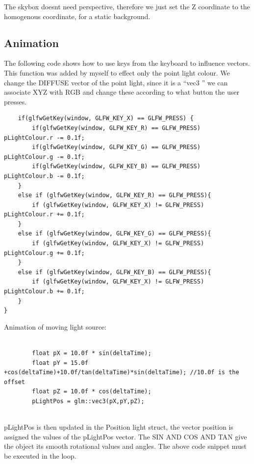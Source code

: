 \documentclass[a4paper,11pt]{article}
\begin{document}
The skybox doesnt need perspective, therefore we just set the Z coordinate to the homogenous coordinate, for a static background.

\subsection{Animation}

The following code shows how to use keys from the keyboard to influence vectors. This function was added by myself to effect only the point light colour. We change the DIFFUSE vector of the point light, since it is a ``vec3 '' we can associate XYZ with RGB and change these according to what button the user presses.
	
	\begin{lstlisting}
	if(glfwGetKey(window, GLFW_KEY_X) == GLFW_PRESS) {
        if(glfwGetKey(window, GLFW_KEY_R) == GLFW_PRESS) pLightColour.r -= 0.1f;
        if(glfwGetKey(window, GLFW_KEY_G) == GLFW_PRESS) pLightColour.g -= 0.1f;
        if(glfwGetKey(window, GLFW_KEY_B) == GLFW_PRESS) pLightColour.b -= 0.1f;
    }
    else if (glfwGetKey(window, GLFW_KEY_R) == GLFW_PRESS){
        if (glfwGetKey(window, GLFW_KEY_X) != GLFW_PRESS) pLightColour.r += 0.1f;
    }
    else if (glfwGetKey(window, GLFW_KEY_G) == GLFW_PRESS){
        if (glfwGetKey(window, GLFW_KEY_X) != GLFW_PRESS) pLightColour.g += 0.1f;
    }
    else if (glfwGetKey(window, GLFW_KEY_B) == GLFW_PRESS){
        if (glfwGetKey(window, GLFW_KEY_X) != GLFW_PRESS) pLightColour.b += 0.1f;
    }
}
	\end{lstlisting}

	
	Animation of moving light source:
	
	\begin{lstlisting}
	 
        float pX = 10.0f * sin(deltaTime);
        float pY = 15.0f +cos(deltaTime)+10.0f/tan(deltaTime)*sin(deltaTime); //10.0f is the offset
        float pZ = 10.0f * cos(deltaTime);
        pLightPos = glm::vec3(pX,pY,pZ);
        
	\end{lstlisting}
	
	pLightPos is then updated in the Position light struct, the vector position is assigned the values of the pLightPos vector. The SIN AND COS AND TAN give the object its smooth rotational values and angles. The above code snippet must be executed in the loop.
	
	
	
\end{document}
